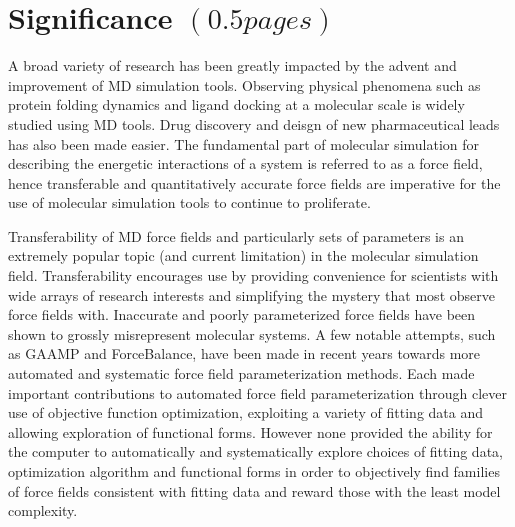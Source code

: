 \documentclass[rmp,nofootinbib,superscriptaddress,12pt,tightenlines,notitlepage]{revtex4-1}
\begin{document}
\section{Significance $\left(0.5 pages\right)$}
A broad variety of research has been greatly impacted by the advent and improvement of MD simulation tools. Observing physical phenomena such as protein folding dynamics and ligand docking at a molecular scale is widely studied using MD tools.\cite{villin} Drug discovery and deisgn of new pharmaceutical leads has also been made easier.\cite{drug_discov} The fundamental part of molecular simulation for describing the energetic interactions of a system is referred to as a force field, hence transferable and quantitatively accurate force fields are imperative for the use of molecular simulation tools to continue to proliferate.


Transferability of MD force fields and particularly sets of parameters is an extremely popular topic (and current limitation) in the molecular simulation field.\cite{transferability1,transferability2,transferability3,transferability4} Transferability encourages use by providing convenience for scientists with wide arrays of research interests and simplifying the mystery that most observe force fields with. Inaccurate and poorly parameterized force fields have been shown to grossly misrepresent molecular systems.\cite{ffcomp1,ffcomp2} A few notable attempts, such as GAAMP and ForceBalance, have been made in recent years towards more automated and systematic force field parameterization methods.\cite{GAAMP,FB1,FB2,FB3} Each made important contributions to automated force field parameterization through clever use of objective function optimization, exploiting a variety of fitting data and allowing exploration of functional forms. However none provided the ability for the computer to automatically and systematically explore choices of fitting data, optimization algorithm and functional forms in order to objectively find families of force fields consistent with fitting data and reward those with the least model complexity.
\end{document}
